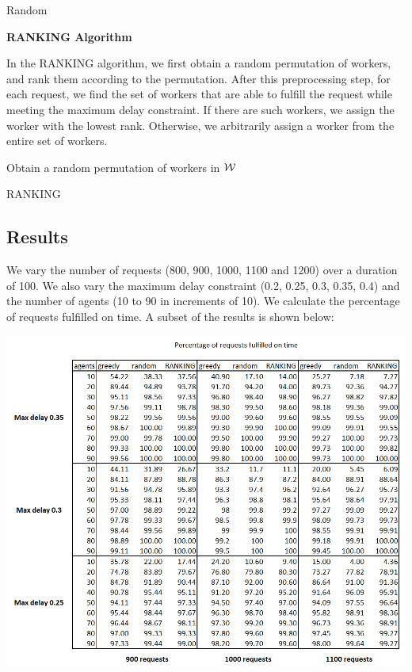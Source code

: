 \documentclass[urop]{nurop}
\begin{document}
\begin{algorithm}[H]
\SetAlgoLined
{}
 \caption{Random}
\end{algorithm}

\vspace{2mm} \noindent \textbf{RANKING Algorithm}

\noindent In the RANKING algorithm, we first obtain a random permutation of workers, and rank them according to the permutation. After this preprocessing step, for each request, we find the set of workers that are able to fulfill the request while meeting the maximum delay constraint. If there are such workers, we assign the worker with the lowest rank. Otherwise, we arbitrarily assign a worker from the entire set of workers.

\begin{algorithm}[H]
\SetAlgoLined
{}
 Obtain a random permutation of workers in $\mathcal{W}$\;
 \caption{RANKING}
\end{algorithm}

\subsection{Results}
We vary the number of requests (800, 900, 1000, 1100 and 1200) over a duration of 100. We also vary the maximum delay constraint (0.2, 0.25, 0.3, 0.35, 0.4) and the number of agents (10 to 90 in increments of 10). We calculate the percentage of requests fulfilled on time. A subset of the results is shown below:

\includegraphics[scale = 0.9]{results}
\end{document}
